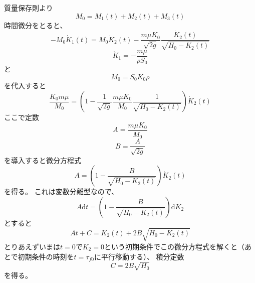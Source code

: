 \documentclass[]{article}
\begin{document}
質量保存則より
\begin{equation} \label{250917175922} 
   M_0 = M_1(t) + M_2(t) + M_3(t)
\end{equation}
時間微分をとると、
\begin{equation} \label{250917180035} 
   -M_0 \dot{K}_1(t) = M_0 \dot{K}_2(t)  - \frac{m\mu K_0}{\sqrt{2g}} \frac{\dot{K}_2(t)}{\sqrt{H_0-K_2(t)}}
\end{equation}
\begin{equation} \label{250917180138} 
   \dot{K}_1 = -\frac{m\mu}{\rho S_0}
\end{equation}
と
\begin{equation} \label{250917180220} 
   M_0 =  S_0 K_0 \rho
\end{equation}
を代入すると
\begin{equation} \label{250917180242} 
   \frac{K_0 m \mu}{M_0} =  \left(1 - \frac{1}{\sqrt{2g}}\frac{m \mu K_0}{M_0}  \frac{1}{\sqrt{H_0-K_2(t)}}\right) \dot{K}_2(t)
\end{equation}
ここで定数
\begin{equation} \label{250917180407} 
   A = \frac{m \mu K_0}{M_0}
\end{equation}
\begin{equation} \label{250917180426} 
   B  = \frac{A}{\sqrt{2g}}
\end{equation}
を導入すると微分方程式
\begin{equation} \label{250917180438} 
   A = \left(1 -   \frac{B}{\sqrt{H_0-K_2(t)}}\right) \dot{K}_2(t)
\end{equation}
を得る。
これは変数分離型なので、
\begin{equation} \label{250917180856} 
   A  \mathrm{d}t =  \left(1 -   \frac{B}{\sqrt{H_0-K_2(t)}}\right) \mathrm{d} K_2
\end{equation}
とすると
\begin{equation} \label{250917181005} 
   A t + C =  K_2(t) + 2B\sqrt{H_0-K_2(t)}
\end{equation}
とりあえずいまは$t=0$で$K_2=0$という初期条件でこの微分方程式を解くと（あとで初期条件の時刻を$t=\tau_{f0}$に平行移動する）、
積分定数
\begin{equation} \label{250917180719} 
  C = 2B\sqrt{H_0}
\end{equation}
を得る。
\end{document}
